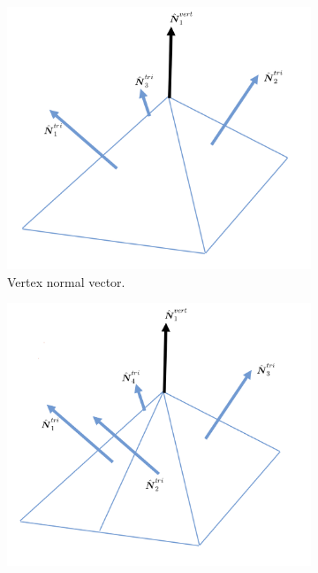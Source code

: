 \documentclass[11pt]{article}
\begin{document}
\begin{figure}[t]
  \centering
  \begin{subfigure}[b]{.3\linewidth}
    \centering
    \includegraphics[width=\linewidth]{normal_vertex.png}%
    \caption{Vertex normal vector.}
    \label{normalvert1}
  \end{subfigure}
  \hfill
  \begin{subfigure}[b]{.3\linewidth}
    \centering
    \includegraphics[width=\linewidth]{normal_vertex_2.png}%

\end{subfigure}
\end{figure}
\end{document}
